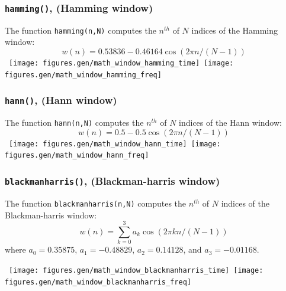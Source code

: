 \subsubsection{{\tt hamming()}, (Hamming window)}
\label{module:math:window:hamming}
The function {\tt hamming(n,N)} computes the $n^{th}$ of $N$ indices of
the Hamming window:
%
\begin{equation}
\label{eqn:math:window:hamming}
    w(n) = 0.53836 - 0.46164 \cos\left( 2 \pi n / (N-1) \right)
\end{equation}
%
% 
\mbox{
  \centering
  \texttt{[image: figures.gen/math\_window\_hamming\_time]}
  \quad
  \texttt{[image: figures.gen/math\_window\_hamming\_freq]}
}

\subsubsection{{\tt hann()}, (Hann window)}
\label{module:math:window:hann}
The function {\tt hann(n,N)} computes the $n^{th}$ of $N$ indices of
the Hann window:
%
\begin{equation}
\label{eqn:math:window:hann}
    w(n) = 0.5 - 0.5 \cos\left( 2 \pi n / (N-1) \right)
\end{equation}
%
% 
\mbox{
  \centering
  \texttt{[image: figures.gen/math\_window\_hann\_time]}
  \quad
  \texttt{[image: figures.gen/math\_window\_hann\_freq]}
}
%


\subsubsection{{\tt blackmanharris()}, (Blackman-harris window)}
\label{module:math:window:blackmanharris}
The function {\tt blackmanharris(n,N)} computes the $n^{th}$ of $N$
indices of the Blackman-harris window:
%
\begin{equation}
\label{eqn:math:window:blackmanharris}
    w(n) = \sum_{k=0}^{3} { a_k \cos\left( 2 \pi k n / (N-1)\right) }
\end{equation}
%
where
$a_0 =  0.35875$,
$a_1 = -0.48829$,
$a_2 =  0.14128$, and
$a_3 = -0.01168$.

%
% 
\mbox{
  \centering
  \texttt{[image: figures.gen/math\_window\_blackmanharris\_time]}
  \quad
  \texttt{[image: figures.gen/math\_window\_blackmanharris\_freq]}
}
%

